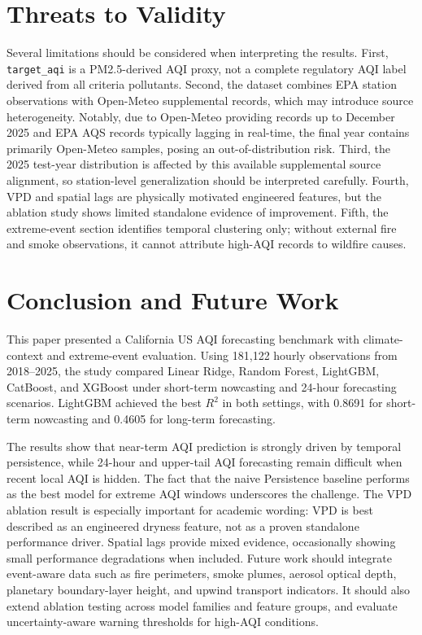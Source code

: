 \documentclass[11pt,a4paper]{article}
\begin{document}
\section{Threats to Validity}
Several limitations should be considered when interpreting the results. First, \texttt{target\_aqi} is a PM2.5-derived AQI proxy, not a complete regulatory AQI label derived from all criteria pollutants. Second, the dataset combines EPA station observations with Open-Meteo supplemental records, which may introduce source heterogeneity. Notably, due to Open-Meteo providing records up to December 2025 and EPA AQS records typically lagging in real-time, the final year contains primarily Open-Meteo samples, posing an out-of-distribution risk. Third, the 2025 test-year distribution is affected by this available supplemental source alignment, so station-level generalization should be interpreted carefully. Fourth, VPD and spatial lags are physically motivated engineered features, but the ablation study shows limited standalone evidence of improvement. Fifth, the extreme-event section identifies temporal clustering only; without external fire and smoke observations, it cannot attribute high-AQI records to wildfire causes.

\section{Conclusion and Future Work}
This paper presented a California US AQI forecasting benchmark with climate-context and extreme-event evaluation. Using 181,122 hourly observations from 2018--2025, the study compared Linear Ridge, Random Forest, LightGBM, CatBoost, and XGBoost under short-term nowcasting and 24-hour forecasting scenarios. LightGBM achieved the best $R^2$ in both settings, with 0.8691 for short-term nowcasting and 0.4605 for long-term forecasting.

The results show that near-term AQI prediction is strongly driven by temporal persistence, while 24-hour and upper-tail AQI forecasting remain difficult when recent local AQI is hidden. The fact that the naive Persistence baseline performs as the best model for extreme AQI windows underscores the challenge. The VPD ablation result is especially important for academic wording: VPD is best described as an engineered dryness feature, not as a proven standalone performance driver. Spatial lags provide mixed evidence, occasionally showing small performance degradations when included. Future work should integrate event-aware data such as fire perimeters, smoke plumes, aerosol optical depth, planetary boundary-layer height, and upwind transport indicators. It should also extend ablation testing across model families and feature groups, and evaluate uncertainty-aware warning thresholds for high-AQI conditions.

\begingroup
\small


\endgroup
\end{document}
